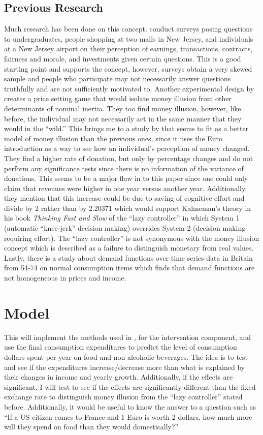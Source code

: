 \documentclass{paper}
\begin{document}
\subsection{Previous Research}
Much research has been done on this concept. \cite{shafetal1997} conduct surveys posing questions to undergraduates, people shopping at two malls in New Jersey, and individuals at a New Jersey airport on their perception of earnings, transactions, contracts, fairness and morale, and investments given certain questions. This is a good starting point and supports the concept, however, surveys obtain a very skewed sample and people who participate may not necessarily answer questions truthfully and are not sufficiently motivated to. Another experimental design by \cite{fehretal2001} creates a price setting game that would isolate money illusion from other determinants of nominal inertia. They too find money illusion, however, like before, the individual may not necessarily act in the same manner that they would in the ``wild.'' This brings me to a study by \cite{kooretal2004} that seems to fit as a better model of money illusion than the previous ones, since it uses the Euro introduction as a way to see how an individual's perception of money changed. They find a higher rate of donation, but only by percentage changes and do not perform any significance tests since there is no information of the variance of donations. This seems to be a major flaw in to this paper since one could only claim that revenues were higher in one year versus another year. Additionally, they mention that this increase could be due to saving of cognitive effort and divide by 2 rather than by 2.20371 which would support Kahneman's theory in his book \textit{Thinking Fast and Slow} of the ``lazy controller'' in which System 1 (automatic ``knee-jerk'' decision making) overrides System 2 (decision making requiring effort). The ``lazy controller'' is not synonymous with the money illusion concept which is described as a failure to distinguish monetary from real values. Lastly, there is a study about demand functions over time series data in Britain from 54-74 on normal consumption items which finds that demand functions are not homogeneous in prices and income. \citep{deatmuel1980}          

\section{Model}

This will implement the methods used in \cite{cryechan2008}, for the intervention component, and use the final consumption expenditures to predict the level of consumption dollars spent per year on food and non-alcoholic beverages. The idea is to test and see if the expenditures increase/decrease more than what is explained by their changes in income and yearly growth. Additionally, if the effects are significant, I will test to see if the effects are significantly different than the fixed exchange rate to distinguish money illusion from the ``lazy controller'' stated before. Additionally, it would be useful to know the answer to a question such as ``If a US citizen comes to France and 1 Euro is worth 2 dollars, how much more will they spend on food than they would domestically?''
\end{document}
